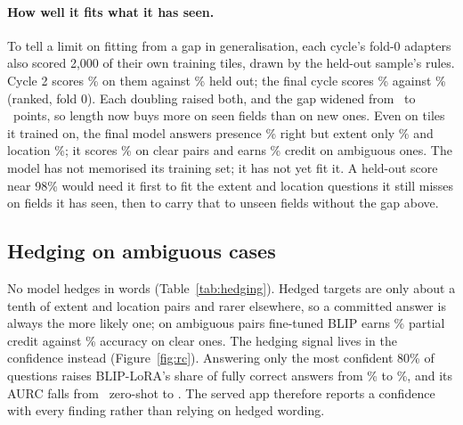 \documentclass[10pt,twocolumn]{article}
\begin{document}
\paragraph{How well it fits what it has seen.} To tell a limit on fitting from a gap in generalisation, each cycle's fold-0 adapters also scored 2,000 of their own training tiles, drawn by the held-out sample's rules. Cycle 2 scores \fitTwoTrain\% on them against \fitTwoHeld\% held out; the final cycle scores \fitTrain\% against \fitHeld\% (ranked, fold 0). Each doubling raised both, and the gap widened from \fitTwoGap\ to \fitGap\ points, so length now buys more on seen fields than on new ones. Even on tiles it trained on, the final model answers presence \fitPresence\% right but extent only \fitExtent\% and location \fitLocation\%; it scores \fitClear\% on clear pairs and earns \fitAmbig\% credit on ambiguous ones. The model has not memorised its training set; it has not yet fit it. A held-out score near 98\% would need it first to fit the extent and location questions it still misses on fields it has seen, then to carry that to unseen fields without the gap above.

\subsection{Hedging on ambiguous cases}
\begin{table}[t]\centering\small
\resizebox{\textwidth}{!}{}
\caption{Hedging and calibration on fold 0 under greedy generation, whose words could hedge (\%, except ECE and AURC). Hedge rates are the share of answers that hedge; credit on ambiguous pairs gives 0.5 for committing to one side. AURC: area under the risk--coverage curve, lower is better.}\label{tab:hedging}
\end{table}
No model hedges in words (Table~\ref{tab:hedging}). Hedged targets are only about a tenth of extent and location pairs and rarer elsewhere, so a committed answer is always the more likely one; on ambiguous pairs fine-tuned BLIP earns \blipCreditAmb\% partial credit against \blipAccClear\% accuracy on clear ones. The hedging signal lives in the confidence instead (Figure~\ref{fig:rc}). Answering only the most confident 80\% of questions raises BLIP-LoRA's share of fully correct answers from \blipAccAll\% to \blipAccEighty\%, and its AURC falls from \zeroAurc\ zero-shot to \blipAurc. The served app therefore reports a confidence with every finding rather than relying on hedged wording.
\end{document}

